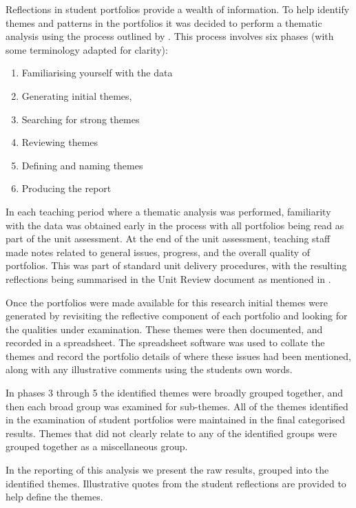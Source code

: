 Reflections in student portfolios provide a wealth of information. To help identify themes and patterns in the portfolios it was decided to perform a thematic analysis using the process outlined by \citet{Braun:2008}. This process involves six phases (with some terminology adapted for clarity):
\begin{enumerate}
  \item Familiarising yourself with the data
  \item Generating initial themes,
  \item Searching for strong themes
  \item Reviewing themes
  \item Defining and naming themes
  \item Producing the report
\end{enumerate}

In each teaching period where a thematic analysis was performed, familiarity with the data was obtained early in the process with all portfolios being read as part of the unit assessment. At the end of the unit assessment, teaching staff made notes related to general issues, progress, and the overall quality of portfolios. This was part of standard unit delivery procedures, with the resulting reflections being summarised in the Unit Review document as mentioned in .

Once the portfolios were made available for this research initial themes were generated by revisiting the reflective component of each portfolio and looking for the qualities under examination. These themes were then documented, and recorded in a spreadsheet. The spreadsheet software was used to collate the themes and record the portfolio details of where these issues had been mentioned, along with any illustrative comments using the students own words.

In phases 3 through 5 the identified themes were broadly grouped together, and then each broad group was examined for sub-themes. All of the themes identified in the examination of student portfolios were maintained in the final categorised results. Themes that did not clearly relate to any of the identified groups were grouped together as a miscellaneous group.

In the reporting of this analysis we present the raw results, grouped into the identified themes. Illustrative quotes from the student reflections are provided to help define the themes.



